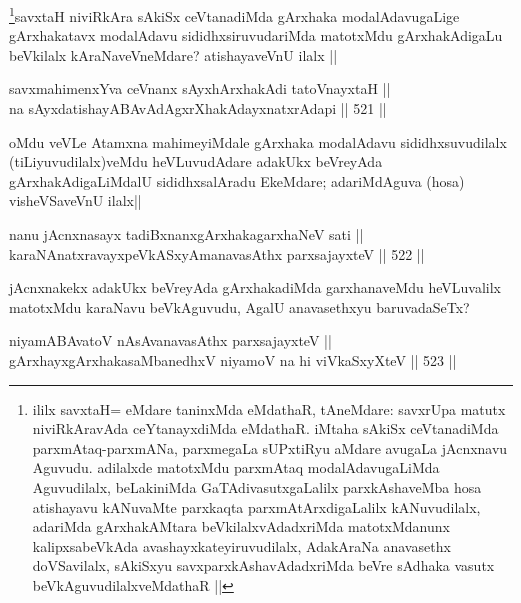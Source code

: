 \begin{artha}
\footnote{ililx savxtaH= eMdare taninxMda eMdathaR, tAneMdare: savxrUpa matutx niviRkAravAda ceYtanayxdiMda eMdathaR. iMtaha sAkiSx ceVtanadiMda parxmAtaq-parxmANa, parxmegaLa sUPxtiRyu aMdare avugaLa jAcnxnavu Aguvudu. adilalxde matotxMdu parxmAtaq modalAdavugaLiMda Aguvudilalx, beLakiniMda GaTAdivasutxgaLalilx parxkAshaveMba hosa atishayavu kANuvaMte parxkaqta parxmAtArxdigaLalilx kANuvudilalx, adariMda gArxhakAMtara beVkilalxvAdadxriMda matotxMdanunx kalipxsabeVkAda avashayxkateyiruvudilalx, AdakAraNa anavasethx doVSavilalx, sAkiSxyu savxparxkAshavAdadxriMda beVre sAdhaka vasutx beVkAguvudilalxveMdathaR ||}savxtaH niviRkAra sAkiSx ceVtanadiMda gArxhaka modalAdavugaLige gArxhakatavx modalAdavu sididhxsiruvudariMda matotxMdu gArxhakAdigaLu beVkilalx kAraNaveVneMdare? atishayaveVnU ilalx ||
\end{artha}

\begin{shl}
savxmahimenxYva ceVnanx sAyxhArxhakAdi tatoV\s nayxtaH || \\
na sAyxdatishayABAvAdAgxrXhakAdayxnatxrAdapi ||  521 ||  
\end{shl}

\begin{artha}
oMdu veVLe Atamxna mahimeyiMdale gArxhaka modalAdavu sididhxsuvudilalx (tiLiyuvudilalx)veMdu  heVLuvudAdare adakUkx beVreyAda gArxhakAdigaLiMdalU sididhxsalAradu EkeMdare; adariMdAguva (hosa) visheVSaveVnU ilalx||
\end{artha}


\begin{shl}
nanu jAcnxnasayx tadiBxnanxgArxhakagarxhaNeV sati || \\
karaNAnatxravayxpeVkASxyAmanavasAthx parxsajayxteV ||  522 ||  
\end{shl}

\begin{artha}
jAcnxnakekx adakUkx beVreyAda gArxhakadiMda garxhanaveMdu heVLuvalilx matotxMdu karaNavu beVkAguvudu, AgalU anavasethxyu baruvadaSeTx?
\end{artha}


\begin{shl}
niyamABAvatoV nAsAvanavasAthx parxsajayxteV || \\
gArxhayxgArxhakasaMbanedhxV niyamoV na hi viVkaSxyXteV ||  523 ||  
\end{shl}

